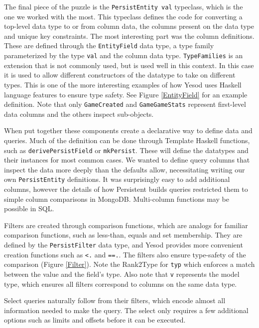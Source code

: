 \documentclass[letterpaper,twocolumn,9pt]{article}
\newcommand{\code}[1]{\texttt{#1}}
\begin{document}
The final piece of the puzzle is the \code{PersistEntity val} typeclass, which is the one we worked with the most.  This typeclass defines the code for converting a top-level data type to or from column data, the columns present on the data type and unique key constraints.  The most interesting part was the column definitions. These are defined through the \code{EntityField} data type, a type family parameterized by the type \code{val} and the column data type.  \code{TypeFamilies} is an extension that is not commonly used, but is used well in this context.  In this case it is used to allow different constructors of the datatype to take on different types.  This is one of the more interesting examples of how Yesod uses Haskell language features to ensure type safety.  See Figure \ref{EntityField} for an example definition. Note that only \code{GameCreated} and \code{GameGameStats} represent first-level data columns and the others inspect sub-objects.

When put together these components create a declarative way to define data and queries.  Much of the definition can be done through Template Haskell functions, such as \code{derivePersistField} or \code{mkPersist}.  These will define the datatypes and their instances for most common cases.  We wanted to define query columns that inspect the data more deeply than the defaults allow, necessitating writing our own \code{PersistEntity} definitions.  It was surprisingly easy to add additional columns, however the details of how Persistent builds queries restricted them to simple column comparisons in MongoDB. Multi-column functions may be possible in SQL.

Filters are created through comparison functions, which are analogs for familiar comparison functions, such as less-than, equals and set membership.  They are defined by the \code{PersistFilter} data type, and Yesod provides more convenient creation functions such as \code{<.} and \code{==.}.  The filters also ensure type-safety of the comparison (Figure \ref{Filter}).  Note the Rank2Type for \code{typ} which enforces a match between the value and the field's type.  Also note that \code{v} represents the model type, which ensures all filters correspond to columns on the same data type.

Select queries naturally follow from their filters, which encode almost all information needed to make the query.  The select only requires a few additional options such as limits and offsets before it can be executed.
\end{document}
